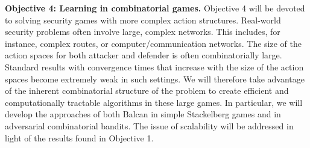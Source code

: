 \textbf{Objective 4:  Learning in combinatorial games.}
Objective 4 will be devoted to solving security games with more complex action structures. 
Real-world security problems often involve large, complex networks. This includes, for instance, complex routes, or computer/communication networks. The size of the action spaces for both attacker and defender is often combinatorially large.  Standard results with convergence times that increase with the size of the action spaces become extremely weak in such settings.
We will therefore take advantage of the inherent combinatorial structure of the problem to create efficient and computationally tractable algorithms in these large games.   In particular, we will develop the approaches of both Balcan in simple Stackelberg games and  in adversarial combinatorial bandits\cite{Balcan15CR,cesa2012combinatorial}.
The issue of scalability will be addressed in light of the results found in Objective 1.


